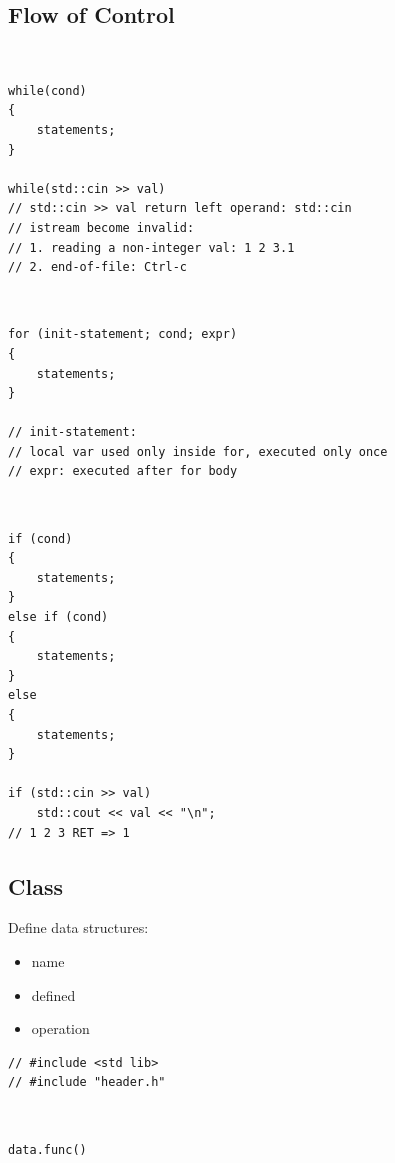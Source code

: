\documentclass{article}
\begin{document}
\subsection{Flow of Control}
\begin{definition}[while]~
    \begin{verbatim}
while(cond)
{
    statements;
}

while(std::cin >> val)
// std::cin >> val return left operand: std::cin
// istream become invalid:
// 1. reading a non-integer val: 1 2 3.1
// 2. end-of-file: Ctrl-c
\end{verbatim}
\end{definition}

\begin{definition}[for]~
    \begin{verbatim}
for (init-statement; cond; expr)
{
    statements;
}

// init-statement:
// local var used only inside for, executed only once
// expr: executed after for body
\end{verbatim}
\end{definition}

\begin{definition}[if]~
    \begin{verbatim}
if (cond)
{
    statements;
}
else if (cond)
{
    statements;
}
else
{
    statements;
}

if (std::cin >> val)
    std::cout << val << "\n";
// 1 2 3 RET => 1
\end{verbatim}
\end{definition}

\subsection{Class}
\begin{definition}[class]
    Define data structures:
    \begin{itemize}
        \item name
        \item defined
        \item operation
    \end{itemize}
    \begin{verbatim}
// #include <std lib>
// #include "header.h"
\end{verbatim}
\end{definition}

\begin{definition}~
    \begin{verbatim}
data.func()
\end{verbatim}
\end{definition}
\end{document}
